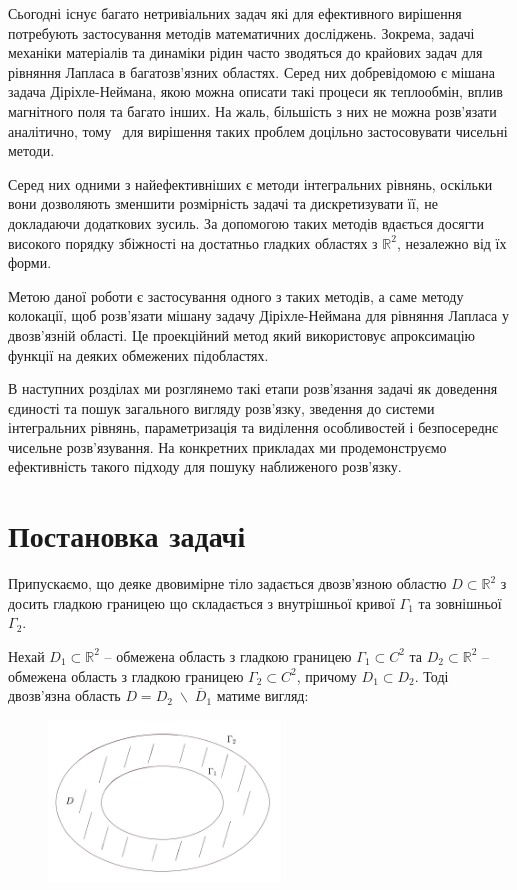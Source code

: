 \documentclass[14pt,a4paper]{extarticle}
\newcounter{e}
\numberwithin{equation}{section}
\numberwithin{figure}{section}
\begin{document}
 
 Сьогодні існує багато нетривіальних задач які для ефективного вирішення потребують застосування методів математичних досліджень. Зокрема, задачі механіки матеріалів та динаміки рідин часто зводяться до крайових задач для рівняння Лапласа в багатозв'язних областях. Серед них добревідомою є мішана задача Діріхле-Неймана, якою можна описати такі процеси як теплообмін, вплив магнітного поля та багато інших. На жаль, більшість з них не можна розв'язати аналітично, тому  для вирішення таких проблем доцільно застосовувати чисельні методи. 
 
 Серед них одними з найефективніших є методи інтегральних рівнянь, оскільки вони дозволяють зменшити розмірність задачі та дискретизувати її, не докладаючи додаткових зусиль. За допомогою таких методів вдається досягти високого порядку збіжності на достатньо гладких областях з $\mathbb{R}^2$, незалежно від їх форми.
 
 Метою даної роботи є застосування одного з таких методів, а саме методу колокації, щоб розв'язати мішану задачу Діріхле-Неймана для рівняння Лапласа у двозв'язній області. Це проекційний метод який використовує апроксимацію функції на деяких обмежених підобластях.
 
 В наступних розділах ми розглянемо такі етапи розв'язання задачі як доведення єдиності та пошук загального вигляду розв'язку, зведення до системи інтегральних рівнянь, параметризація та виділення особливостей і безпосереднє чисельне розв'язування. На конкретних прикладах ми продемонструємо ефективність такого підходу для пошуку наближеного розв'язку.
   
 \newpage
 \thispagestyle{empty}
 \section{Постановка задачі}
		
	Припускаємо, що деяке двовимірне тіло задається двозв'язною областю $D \subset \mathbb{R}^2$ з досить гладкою границею що складається з внутрішньої кривої $\Gamma_1$ та зовнішньої $\Gamma_2$. 
	
	Нехай $D_1 \subset \mathbb{R}^2$ – обмежена область з гладкою границею $\Gamma_1 \subset C^2$ та $D_2 \subset \mathbb{R}^2$ – обмежена область з гладкою границею $\Gamma_2 \subset C^2$, причому $D_1\subset D_2$. Тоді двозв'язна область $D = D_2 \; \backslash \; \overline{D}_1$ матиме вигляд:

	\begin{figure}[h]
		\centering
		\includegraphics[width=0.55\textwidth]{resources/doubly-connected-region}
		\caption{}
		\label{fig:double-connected-region}
	\end{figure}
\end{document}
